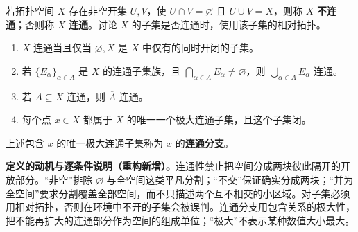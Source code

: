 \documentclass[../../main.tex]{subfiles}%
\begin{document}
\begin{exercise}\label{exercise:ch04-connectedness}
\begin{definition*}[连通与不连通]\label{definition:ch04-connectedness}
若拓扑空间 $X$ 存在非空开集 $U,V$，使 $U\cap V=\varnothing$ 且 $U\cup V=X$，则称 $X$ \textbf{不连通}；否则称 $X$ \textbf{连通}。讨论 $X$ 的子集是否连通时，使用该子集的相对拓扑。
\end{definition*}
\begin{enumerate}
\item\label{item:ch04-connected-clopen} $X$ 连通当且仅当 $\varnothing,X$ 是 $X$ 中仅有的同时开闭的子集。
\item\label{item:ch04-connected-union} 若 $\{E_\alpha\}_{\alpha\in A}$ 是 $X$ 的连通子集族，且 $\bigcap_{\alpha\in A}E_\alpha\ne\varnothing$，则 $\bigcup_{\alpha\in A}E_\alpha$ 连通。
\item\label{item:ch04-connected-closure} 若 $A\subseteq X$ 连通，则 $\overline A$ 连通。
\item\label{item:ch04-connected-component} 每个点 $x\in X$ 都属于 $X$ 的唯一一个极大连通子集，且这个子集闭。
\end{enumerate}
\begin{definition*}[连通分支]\label{definition:ch04-connected-component}
上述包含 $x$ 的唯一极大连通子集称为 $x$ 的\textbf{连通分支}。
\end{definition*}
\end{exercise}
\begin{remark}
\textbf{定义的动机与逐条件说明（重构新增）。}连通性禁止把空间分成两块彼此隔开的开放部分。“非空”排除 $\varnothing$ 与全空间这类平凡分割；“不交”保证确实分成两块；“并为全空间”要求分割覆盖全部空间，而不只描述两个互不相交的小区域。对子集必须用相对拓扑，否则在环境中不开的子集会被误判。连通分支用包含关系的极大性，把不能再扩大的连通部分作为空间的组成单位；“极大”不表示某种数值大小最大。
\end{remark}
\end{document}
